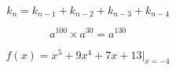 \documentclass[12pt]{article}
\begin{document}
                           
                         
                       \begin{equation}  
                                 k_n = k_{n-1} + k_{n-2}  + k_{n-3} + k_{n-4} 
                       \end{equation} 
                              
                              
                       \begin{equation}  
                                  a^{100} \times a^{30} = a^{130}  
                       \end{equation} 
                              
                       \begin{equation}  
                                 f(x) = x^5 + 9x^4 + 7x + 13 |_{x = -4}  
                       \end{equation}  
                         
                         
               
\end{document}
